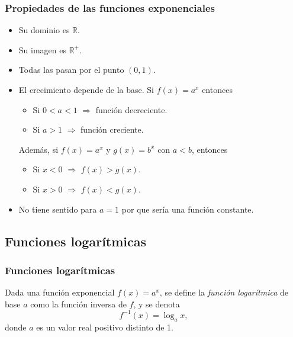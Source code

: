 \begin{frame}
\frametitle{Propiedades de las funciones exponenciales}
\begin{itemize}
\item Su dominio es $\mathbb{R}$.
\item Su imagen es $\mathbb{R}^+$.
\item Todas las pasan por el punto $(0,1)$.
\item El crecimiento depende de la base. Si $f(x)=a^x$ entonces
\begin{itemize}
\item Si $0<a<1$ $\Rightarrow$ función decreciente.
\item Si $a>1$ $\Rightarrow$ función creciente. 
\end{itemize}
Además, si $f(x)=a^x$ y $g(x)=b^x$ con $a<b$, entonces
\begin{itemize}
\item Si $x<0$ $\Rightarrow$ $f(x)>g(x)$.
\item Si $x>0$ $\Rightarrow$ $f(x)<g(x)$.
\end{itemize}

\item No tiene sentido para $a=1$ por que sería una función constante.
\end{itemize}
\end{frame} 



\subsection{Funciones logarítmicas}
\begin{frame}
\frametitle{Funciones logarítmicas}
\begin{definicion}
Dada una función exponencial $f(x)=a^x$, se define la \emph{función logarítmica} de base $a$ como la función inversa de $f$, y se denota
\[
f^{-1}(x)=\log_a x,
\]
donde $a$ es un valor real positivo distinto de 1.
\end{definicion}
\begin{center}
\scalebox{1}{}
\end{center}
\end{frame} 


